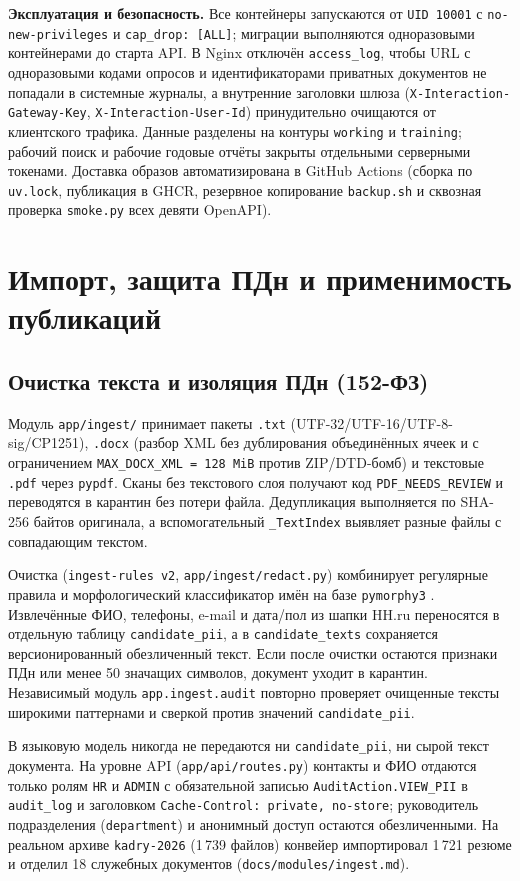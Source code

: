 \documentclass[10pt,a4paper,twocolumn]{article}
\newcommand{\code}[1]{\texttt{#1}}
\begin{document}
\textbf{Эксплуатация и безопасность.} Все контейнеры запускаются от \code{UID 10001} с
\code{no-new-privileges} и \code{cap\_drop: [ALL]}; миграции выполняются одноразовыми
контейнерами до старта API. В Nginx отключён \code{access\_log}, чтобы URL с одноразовыми
кодами опросов и идентификаторами приватных документов не попадали в системные журналы, а
внутренние заголовки шлюза (\code{X-Interaction-Gateway-Key}, \code{X-Interaction-User-Id})
принудительно очищаются от клиентского трафика. Данные разделены на контуры \code{working} и
\code{training}; рабочий поиск и рабочие годовые отчёты закрыты отдельными серверными токенами.
Доставка образов автоматизирована в GitHub Actions (сборка по \code{uv.lock}, публикация в GHCR,
резервное копирование \code{backup.sh} и сквозная проверка \code{smoke.py} всех девяти OpenAPI).

\section{Импорт, защита ПДн и применимость публикаций}

\subsection{Очистка текста и изоляция ПДн (152-ФЗ)}

Модуль \code{app/ingest/} принимает пакеты \code{.txt} (UTF-32/UTF-16/UTF-8-sig/CP1251),
\code{.docx} (разбор XML без дублирования объединённых ячеек и с ограничением
\code{MAX\_DOCX\_XML = 128\,MiB} против ZIP/DTD-бомб) и текстовые \code{.pdf} через
\code{pypdf}. Сканы без текстового слоя получают код \code{PDF\_NEEDS\_REVIEW} и переводятся
в карантин без потери файла. Дедупликация выполняется по SHA-256 байтов оригинала, а
вспомогательный \code{\_TextIndex} выявляет разные файлы с совпадающим текстом.

Очистка (\code{ingest-rules v2}, \code{app/ingest/redact.py}) комбинирует регулярные правила
и морфологический классификатор имён на базе \code{pymorphy3} \citep{korobov2015morphological}.
Извлечённые ФИО, телефоны, e-mail и дата/пол из шапки HH.ru переносятся в отдельную таблицу
\code{candidate\_pii}, а в \code{candidate\_texts} сохраняется версионированный обезличенный
текст. Если после очистки остаются признаки ПДн или менее 50 значащих символов, документ уходит
в карантин. Независимый модуль \code{app.ingest.audit} повторно проверяет очищенные тексты
широкими паттернами и сверкой против значений \code{candidate\_pii}.

В языковую модель никогда не передаются ни \code{candidate\_pii}, ни сырой текст документа.
На уровне API (\code{app/api/routes.py}) контакты и ФИО отдаются только ролям \code{HR} и
\code{ADMIN} с обязательной записью \code{AuditAction.VIEW\_PII} в \code{audit\_log} и
заголовком \code{Cache-Control: private, no-store}; руководитель подразделения
(\code{department}) и анонимный доступ остаются обезличенными. На реальном архиве
\code{kadry-2026} (1\,739 файлов) конвейер импортировал 1\,721 резюме и отделил 18 служебных
документов (\code{docs/modules/ingest.md}).
\end{document}
